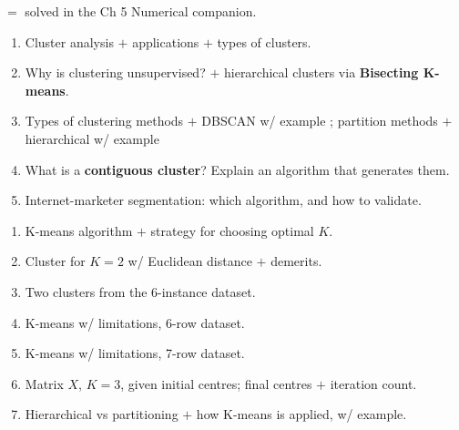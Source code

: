 \hr


{\color{sub}\footnotesize {} $=$ solved in the Ch 5 Numerical companion.}

\begin{enumerate}
  \item {} Cluster analysis $+$ applications $+$ types of clusters.
        \hfill {}         
  \item {} Why is clustering unsupervised? $+$ hierarchical clusters via \textbf{Bisecting K-means}.
        \hfill {} 
  \item {} Types of clustering methods $+$ DBSCAN w/ example \hfill {} ;
        partition methods $+$ hierarchical w/ example \hfill {} 
  \item {} What is a \textbf{contiguous cluster}? Explain an algorithm that generates them.
        \hfill {} 
  \item {} Internet-marketer segmentation: which algorithm, and how to validate. \hfill {} 
\end{enumerate}

\begin{enumerate}[start=6]
  \item {} K-means algorithm $+$ strategy for choosing optimal $K$. \hfill {} 
  \item {} Cluster for $K=2$ w/ Euclidean distance $+$ demerits. \hfill {} 
  \item {} Two clusters from the 6-instance dataset. \hfill {}   
  \item {} K-means w/ limitations, 6-row dataset. \hfill {} 
  \item {} K-means w/ limitations, 7-row dataset. \hfill {} 
  \item {} Matrix $X$, $K=3$, given initial centres; final centres $+$ iteration count. \hfill {} 
  \item {} Hierarchical vs partitioning $+$ how K-means is applied, w/ example. \hfill {} 
\end{enumerate}

